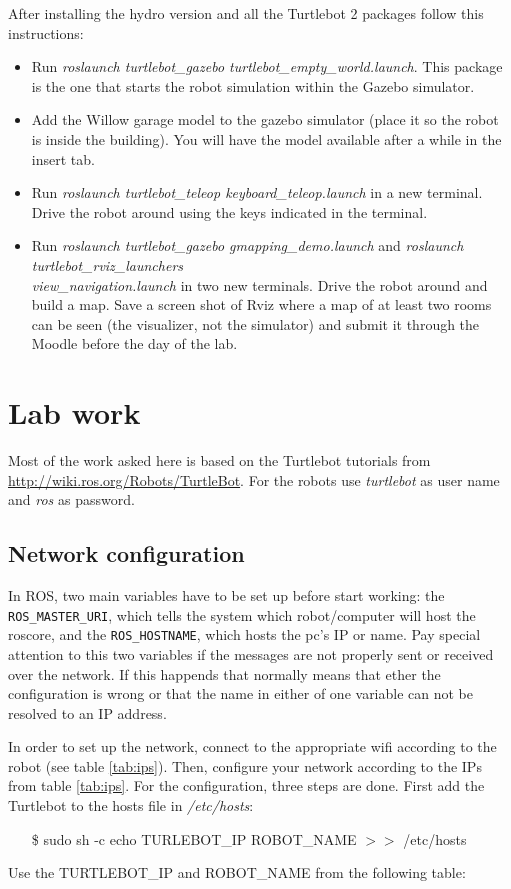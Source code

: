 \documentclass[a4paper,10pt]{article}
\begin{document}
After installing the hydro version and all the Turtlebot 2 packages follow this instructions:
\begin{itemize}
	\item Run \textit{roslaunch turtlebot\_gazebo turtlebot\_empty\_world.launch}. This package is the one that starts the robot simulation within the Gazebo simulator.
	\item Add the Willow garage model to the gazebo simulator (place it so the robot is inside the building). You will have the model available after a while in the insert tab.
	\item Run \textit{roslaunch turtlebot\_teleop keyboard\_teleop.launch} in a new terminal. Drive the robot around using the keys indicated in the terminal.
	\item Run \textit{roslaunch turtlebot\_gazebo gmapping\_demo.launch} and \textit{roslaunch turtlebot\_rviz\_launchers \\ view\_navigation.launch} in two new terminals. Drive the robot around and build a map. Save a screen shot of Rviz where a map of at least two rooms can be seen (the visualizer, not the simulator) and submit it through the Moodle before the day of the lab.
\end{itemize}

\section{Lab work}
Most of the work asked here is based on the Turtlebot tutorials from \url{http://wiki.ros.org/Robots/TurtleBot}. For the robots use \textit{turtlebot} as user name and \textit{ros} as password.

\subsection{Network configuration}
In ROS, two main variables have to be set up before start working: the \texttt{ROS\_MASTER\_URI}, which tells the system which robot/computer will host the roscore, and the \texttt{ROS\_HOSTNAME}, which hosts the pc's IP or name. Pay special attention to this two variables if the messages are not properly sent or received over the network. If this happends that normally means that ether the configuration is wrong or that the name in either of one variable can not be resolved to an IP address.

In order to set up the network, connect to the appropriate wifi according to the robot (see table \ref{tab:ips}). Then, configure your network according to the IPs from table \ref{tab:ips}. For the configuration, three steps are done. First add the Turtlebot to the hosts file in \textit{/etc/hosts}: 
\begin{shaded}
	\begin{itemize}
		\item[\$] sudo sh -c \textquotesingle echo TURLEBOT\_IP  ROBOT\_NAME $>>$ /etc/hosts\textquotesingle
	\end{itemize}
\end{shaded}
Use the TURTLEBOT\_IP and ROBOT\_NAME from the following table:
\end{document}
